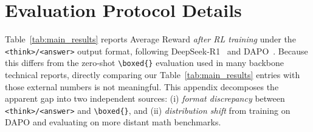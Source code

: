 \documentclass{article} %
\theoremstyle{definition}
\theoremstyle{remark}
\let\cite\citep
\begin{document}



\section{Evaluation Protocol Details}
\label{sec:eval_protocol}

Table~\ref{tab:main_results} reports Average Reward \emph{after RL training} under the \texttt{<think>/<answer>} output format, following DeepSeek-R1~\cite{guo2025deepseek} and DAPO~\cite{yu2025dapo}. Because this differs from the zero-shot \texttt{\textbackslash boxed\{\}} evaluation used in many backbone technical reports, directly comparing our Table~\ref{tab:main_results} entries with those external numbers is not meaningful. This appendix decomposes the apparent gap into two independent sources: (i) \emph{format discrepancy} between \texttt{<think>/<answer>} and \texttt{\textbackslash boxed\{\}}, and (ii) \emph{distribution shift} from training on DAPO and evaluating on more distant math benchmarks.
\end{document}
